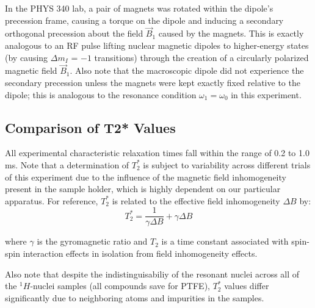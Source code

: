 \documentclass[11pt]{article}
\begin{document}
In the PHYS 340 lab, a pair of magnets was rotated within the dipole's
precession frame, causing a torque on the dipole and inducing a
secondary orthogonal precession about the field $\vec B_1$ caused by
the magnets. This is exactly analogous to an RF pulse lifting nuclear
magnetic dipoles to higher-energy states (by causing $\Delta m_I$ =
$-1$ transitions) through the creation of a circularly polarized
magnetic field $\vec B_1$. Also note that the macroscopic dipole did
not experience the secondary
precession unless the magnets were kept exactly fixed relative to the
dipole; this is analogous to the resonance condition $\omega_1 =
\omega_0$ in this experiment.

\subsection*{Comparison of T2* Values}

All experimental characteristic relaxation times fall within the
range of 0.2 to 1.0 ms. Note that a determination of $T_2^*$ is subject to
variability across different trials of this experiment due to the influence of
the magnetic field inhomogeneity present in the sample holder,
which is highly dependent on our particular apparatus. For reference,
$T_2^*$ is related to the
effective field inhomogeneity $\Delta B$ by:
$$
T_2^* = \frac{1}{\gamma \Delta B} + \gamma \Delta B
$$

where $\gamma$ is the gyromagnetic ratio and $T_2$ is a time constant
associated with spin-spin interaction effects in isolation from field
inhomogeneity effects.

Also note that despite the indistinguisabiliy of the resonant nuclei
across all of the ${}^1H$-nuclei samples (all compounds save for
PTFE), $T_2^*$ values differ significantly due to neighboring atoms
and impurities in the samples.



\end{document}
